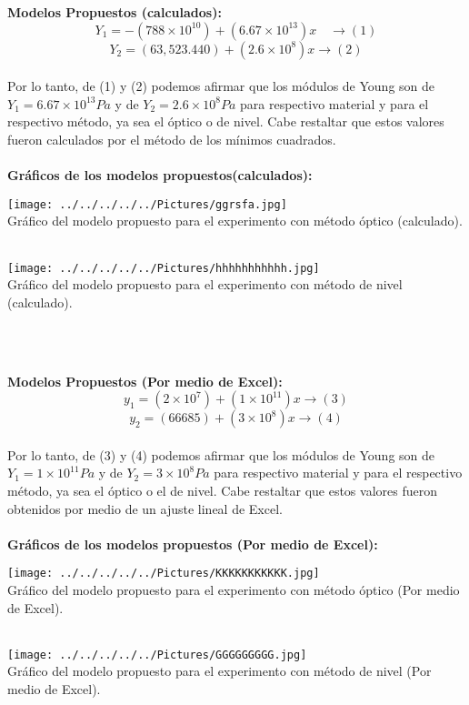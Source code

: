 \documentclass[10pt,a4paper]{article}
\begin{document}
\medskip
\textbf{Modelos Propuestos (calculados):}
\[{ Y }_{ 1 }= -(788\times { 10 }^{ 10 })+(6.67\times { 10 }^{ 13 })x\quad \rightarrow(1) \]
\[{ Y }_{ 2 }= (63,523.440)+(2.6\times { 10 }^{ 8 })x\rightarrow(2)\]
\\
Por lo tanto, de (1) y (2) podemos afirmar que los m\'{o}dulos de Young son de ${ Y }_{ 1 }=6.67\times { 10 }^{ 13 }Pa$ y de ${ Y }_{ 2 }=2.6\times { 10 }^{ 8 }Pa$ para respectivo material y para el respectivo m\'{e}todo, ya sea el \'{o}ptico o de nivel. Cabe restaltar que estos valores fueron calculados por el m\'{e}todo de los m\'{i}nimos cuadrados.\\
\\
\medskip
\textbf{Gr\'{a}ficos de los modelos propuestos(calculados):}
\\
\begin{figure 7}
\centering
\texttt{[image: ../../../../../Pictures/ggrsfa.jpg]} 
\\
\caption{Gr\'{a}fico del modelo propuesto para el experimento con m\'{e}todo \'{o}ptico (calculado).}
\\
\centering
\texttt{[image: ../../../../../Pictures/hhhhhhhhhhh.jpg]} 
\\
\caption{Gr\'{a}fico del modelo propuesto para el experimento con m\'{e}todo de nivel (calculado).}
\\
\end{figure 7}\\
\medskip
\textbf{Modelos Propuestos (Por medio de Excel):}
\\
\[{ y }_{ 1 }=(2\times { 10 }^{ 7 })+(1\times { 10 }^{ 11 })x\rightarrow(3)\]
\[{ y }_{ 2 }=(66685)+(3\times { 10 }^{ 8 })x\rightarrow(4)\]
\\
Por lo tanto, de (3) y (4) podemos afirmar que los m\'{o}dulos de Young son de ${ Y }_{ 1 }=1\times { 10 }^{ 11 }Pa$ y de ${ Y }_{ 2 }=3\times { 10 }^{ 8 }Pa$ para respectivo material y para el respectivo m\'{e}todo, ya sea el \'{o}ptico o el de nivel. Cabe restaltar que estos valores fueron obtenidos por medio de un ajuste lineal de Excel.\\
\pagebreak
\\
\textbf{Gr\'{a}ficos de los modelos propuestos (Por medio de Excel):}
\\
\begin{figure 8}
\centering
\texttt{[image: ../../../../../Pictures/KKKKKKKKKKK.jpg]} 
\\
\caption{Gr\'{a}fico del modelo propuesto para el experimento con m\'{e}todo \'{o}ptico (Por medio de Excel).}
\\
\centering
\texttt{[image: ../../../../../Pictures/GGGGGGGGG.jpg]} 
\\
\caption{Gr\'{a}fico del modelo propuesto para el experimento con m\'{e}todo de nivel (Por medio de Excel).}
\\
\end{figure 8}\\
\end{document}
